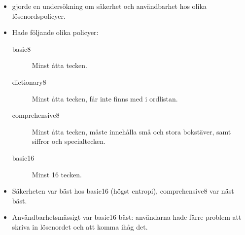 \begin{frame}
  \begin{itemize}
    \item \citet{Komanduri2011opa} gjorde en undersökning om säkerhet och 
      användbarhet hos olika lösenordspolicyer.

      \pause{}

    \item Hade följande olika policyer:
      \begin{description}
        \item[basic8] Minst åtta tecken.

        \item[dictionary8] Minst åtta tecken, får inte finns med i ordlistan.

        \item[comprehensive8] Minst åtta tecken, måste innehålla små och stora 
          bokstäver, samt siffror och specialtecken.

        \item[basic16] Minst 16 tecken.
      \end{description}

      \pause{}

    \item Säkerheten var bäst hos basic16 (högst entropi), comprehensive8 var 
      näst bäst.

    \item Användbarhetsmässigt var basic16 bäst: användarna hade färre problem 
      att skriva in lösenordet och att komma ihåg det.
  \end{itemize}
\end{frame}

